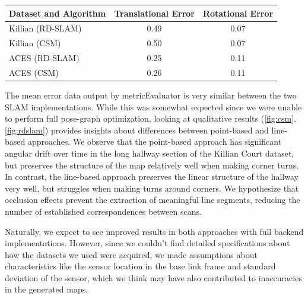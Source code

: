 \documentclass[11pt]{article}
\begin{document}
\begin{center}
\begin{tabular}{|l|c|c|}
\hline
\textbf{Dataset and Algorithm} & \textbf{Translational Error} & \textbf{Rotational Error} \\ 
\hline
Killian (RD-SLAM) & 0.49          & 0.07       \\ \hline
Killian (CSM)     & 0.50          & 0.07       \\ \hline
ACES (RD-SLAM)    & 0.25          & 0.11       \\ \hline
ACES (CSM)        & 0.26          & 0.11       \\ \hline
\end{tabular}
\end{center}

The mean error data output by metricEvaluator\cite{Kmmerle2009OnMT} is very similar between the two SLAM implementations. While this was somewhat expected since we were unable to perform full pose-graph optimization, looking at qualitative results (\ref{fig:csm}, \ref{fig:rdslam}) provides insights about differences between point-based and line-based approaches. We observe that the point-based approach has significant angular drift over time in the long hallway section of the Killian Court dataset, but preserves the structure of the map relatively well when making corner turns. In contrast, the line-based approach preserves the linear structure of the hallway very well, but struggles when making turns around corners. We hypothesize that occlusion effects prevent the extraction of meaningful line segments, reducing the number of established correspondences between scans. 

Naturally, we expect to see improved results in both approaches with full backend implementations. However, since we couldn't find detailed specifications about how the datasets we used were acquired, we made assumptions about characteristics like the sensor location in the base link frame and standard deviation of the sensor, which we think may have also contributed to inaccuracies in the generated maps.
\end{document}
